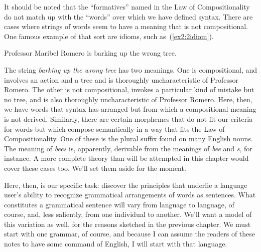 It should be noted that the ``formatives'' named in the Law of Compositionality do not match up with the ``words'' over which we have defined syntax. There are cases where strings of words seem to have a meaning that is not compositional. One famous example of that sort are idioms, such as~(\ref{ex2:2idiom}).%
%
%
%
\begin{exe}
	\ex \label{ex2:2idiom} Professor Maribel Romero is barking up the wrong tree.
\end{exe}
The string \emph{barking up the wrong tree} has two meanings. One is compositional, and involves an action and a tree and is thoroughly uncharacteristic of Professor Romero. The other is not compositional, invokes a particular kind of mistake but no tree, and is also thoroughly uncharacteristic of Professor Romero. Here, then, we have words that syntax has arranged but from which a compositional meaning is not derived. Similarly, there are certain morphemes that do not fit our criteria for words but which compose semantically in a way that fits the Law of Compositionality. One of these is the plural suffix found on many English nouns. The meaning of \emph{bees} is, apparently, derivable from the meanings of \emph{bee} and \emph{s}, for instance. A more complete theory than will be attempted in this chapter would cover these cases too. We'll set them aside for the moment.

Here, then, is our specific task: discover the principles that underlie a language user's ability to recognize grammatical arrangements of words as sentences. What constitutes a grammatical sentence will vary from language to language, of course, and, less saliently, from one individual to another. We'll want a model of this variation as well, for the reasons sketched in the previous chapter. We must start with one grammar, of course, and because I can assume the readers of these notes to have some command of English, I will start with that language.

